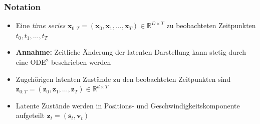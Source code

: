 \begin{frame}
    \frametitle{Notation}
    \begin{itemize}
    	\item Eine \emph{time series} $\mathbf{x}_{0:T}=(\mathbf x_{0}, \mathbf x_{1}, \ldots,\mathbf x_{T})\in \mathbb{R}^{D\times T}$ zu beobachteten Zeitpunkten $t_{0}, t_{1},\ldots,t_{T}$\\
    	\item \textbf{Annahme:} Zeitliche Änderung der latenten Darstellung kann stetig durch eine ODE$^{2}$ beschrieben werden\\
    	\item Zugehörigen latenten Zustände zu den beobachteten Zeitpunkten sind $\mathbf z_{0:T}=(\mathbf z_{0}, \mathbf z_{1}, \ldots, \mathbf z_{T})\in \mathbb{R}^{d\times T}$\\ 
    	\item Latente Zustände werden in Positions- und Geschwindigkeitskomponente aufgeteilt $\mathbf z_{t}=(\mathbf s_{t}, \mathbf v_{t})$
    \end{itemize}
\end{frame}




